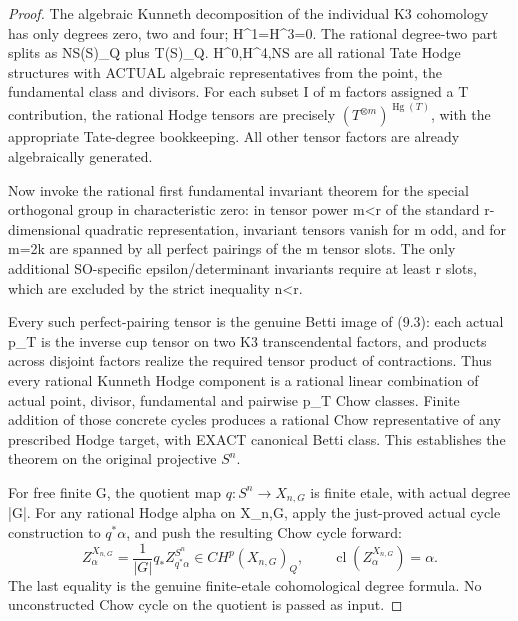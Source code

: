 \documentclass[11pt]{article}
\newcommand{\cl}{\operatorname{cl}}
\begin{document}
\begin{proof}
The algebraic Kunneth decomposition of
the individual K3 cohomology has only
degrees zero, two and four; H^1=H^3=0.
The rational degree-two part splits
as NS(S)_Q plus T(S)_Q.
H^0,H^4,NS are all rational Tate
Hodge structures with ACTUAL algebraic
representatives from the point, the
fundamental class and divisors.
For each subset I of m factors
assigned a T contribution, the rational
Hodge tensors are precisely
\(
 (T^{\otimes m})^{\operatorname{Hg}(T)}
\),
with the appropriate Tate-degree
bookkeeping. All other tensor factors
are already algebraically generated.

Now invoke the rational first
fundamental invariant theorem for the
special orthogonal group in characteristic
zero: in tensor power m<r of the
standard r-dimensional quadratic
representation, invariant tensors
vanish for m odd, and for m=2k
are spanned by all perfect pairings
of the m tensor slots. The only
additional SO-specific epsilon/determinant
invariants require at least r slots,
which are excluded by the strict
inequality n<r.

Every such perfect-pairing tensor
is the genuine Betti image of (9.3):
each actual p_T is the inverse cup
tensor on two K3 transcendental
factors, and products across disjoint
factors realize the required
tensor product of contractions.
Thus every rational Kunneth Hodge
component is a rational linear
combination of actual point,
divisor, fundamental and pairwise
p_T Chow classes. Finite addition
of those concrete cycles produces
a rational Chow representative
of any prescribed Hodge target,
with EXACT canonical Betti class.
This establishes the theorem on
the original projective \(S^n\).

For free finite G, the quotient map
\(q:S^n\to X_{n,G}\) is finite etale,
with actual degree |G|. For any
rational Hodge alpha on X_{n,G},
apply the just-proved actual cycle
construction to \(q^*\alpha\), and
push the resulting Chow cycle forward:
\[
 \boxed{
 Z_\alpha^{X_{n,G}}
 =\frac1{|G|}q_*Z_{q^*\alpha}^{S^n}
             \in CH^p(X_{n,G})_Q,\qquad
 \cl(Z_\alpha^{X_{n,G}})=\alpha.}
                                                               \tag{9.6}
\]
The last equality is the genuine
finite-etale cohomological degree
formula. No unconstructed Chow
cycle on the quotient is passed
as input.
\end{proof}
\end{document}
